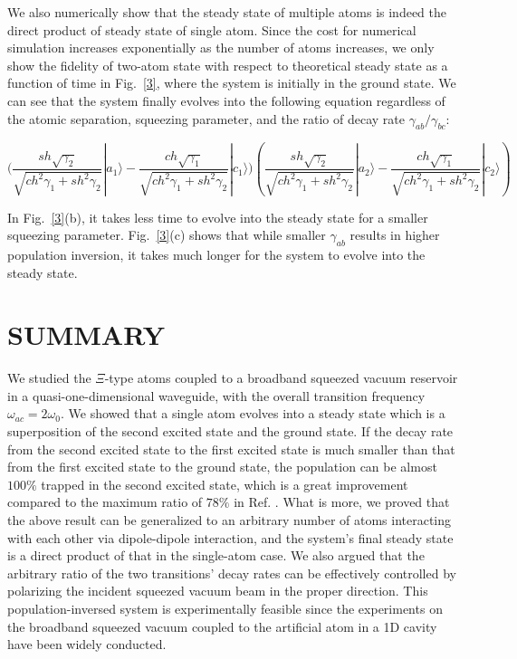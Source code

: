 \documentclass[aps,showpacs,twocolumn,twoside,groupedaddress]{revtex4}
\begin{document}
We also numerically show that the steady state of multiple atoms is indeed the direct product of steady state of single atom. Since the cost for numerical simulation increases exponentially as the number of atoms increases, we only show the fidelity of two-atom state with respect to theoretical steady state as a function of time in Fig.~\ref{3}, where the system is initially in the ground state. We can see that the system finally evolves into the following equation regardless of the atomic separation, squeezing parameter, and the ratio of decay rate $\gamma_{ab}/\gamma_{bc}$: 
\begin{widetext}
\begin{equation}
\ensuremath{(\frac{sh\sqrt{\gamma_{2}}}{\sqrt{ch^{2}\gamma_{1}+sh^{2}\gamma_{2}}}|a_{1}\rangle-\frac{ch\sqrt{\gamma_{1}}}{\sqrt{ch^{2}\gamma_{1}+sh^{2}\gamma_{2}}}|c_{1}\rangle})(\frac{sh\sqrt{\gamma_{2}}}{\sqrt{ch^{2}\gamma_{1}+sh^{2}\gamma_{2}}}|a_{2}\rangle-\frac{ch\sqrt{\gamma_{1}}}{\sqrt{ch^{2}\gamma_{1}+sh^{2}\gamma_{2}}}|c_{2}\rangle)\nonumber
\end{equation}
\end{widetext}
In Fig.~\ref{3}(b), it takes less time to evolve into the steady state for a smaller squeezing parameter. Fig.~\ref{3}(c) shows that while smaller $\gamma_{ab}$ results in higher population inversion, it takes much longer for the system to evolve into the steady state.

\section{SUMMARY}
We studied the $\Xi$-type atoms coupled to a broadband squeezed vacuum reservoir in a quasi-one-dimensional waveguide, with the overall transition frequency $\omega_{ac}=2\omega_0$. We showed that a single atom evolves into a steady state which is a superposition of the second excited state and the ground state. If the decay rate from the second excited state to the first excited state is much smaller than that from the first excited state to the ground state, the population can be almost $100\%$ trapped in the second excited state, which is a great improvement compared to the maximum ratio of $78\%$ in Ref. \cite{ficek1993two}. What is more, we proved that the above result can be generalized to an arbitrary number of atoms interacting with each other via dipole-dipole interaction, and the system's final steady state is a direct product of that in the single-atom case. We also argued that the arbitrary ratio  of the two transitions' decay rates can be effectively controlled by polarizing the incident squeezed vacuum beam in the proper direction. This population-inversed system is experimentally feasible since the experiments on the broadband squeezed vacuum coupled to the artificial atom in a 1D cavity have been widely conducted\cite{turchette1998qa, murch2013kw, toyli2016resonance, bergeal2010analog, wang2018cavity, qin2018exponentially}.
\end{document}
